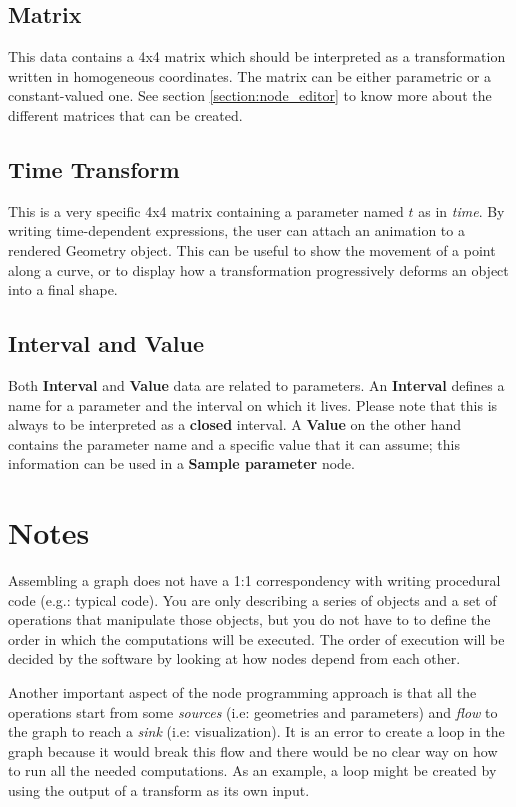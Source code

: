 \subsection{Matrix}
This data contains a 4x4 matrix which should be interpreted as a transformation written in
homogeneous coordinates. The matrix can be either parametric or a constant-valued one.
See section \ref{section:node_editor} to know more about the different matrices that can
be created.

\subsection{Time Transform}
This is a very specific 4x4 matrix containing a parameter named $t$ as in \textit{time}.
By writing time-dependent expressions, the user can attach an animation to 
a rendered Geometry object. This can be useful to show the movement of a
point along a curve, or to display how a transformation progressively deforms an object
into a final shape.

\subsection{Interval and Value}
Both \textbf{Interval} and \textbf{Value} data are related to parameters.
An \textbf{Interval} defines a name for a parameter and the interval on which it lives.
Please note that this is always to be interpreted as a \textbf{closed} interval.
A \textbf{Value} on the other hand contains the parameter name and a specific value that
it can assume; this information can be used in a \textbf{Sample parameter} node.

\section{Notes}
Assembling a graph does not have a 1:1 correspondency with writing procedural
code (e.g.: typical \CC{} code). You are only describing a series of
objects and a set of operations that manipulate those objects, but you do not have to
to define the order in which the computations will be executed. The order of execution
will be decided by the software by looking at how nodes depend from each other.

Another important aspect of the node programming approach is that all the operations
start from some \textit{sources} (i.e: geometries and parameters) and \textit{flow} to the graph
to reach a \textit{sink} (i.e: visualization). It is an error to create a loop in the graph because
it would break this flow and there would be no clear way on how to run all the
needed computations.
As an example, a loop might be created by using the output of a
transform as its own input.

